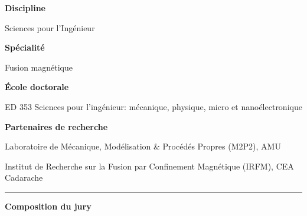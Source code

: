 
\begin{center}
	\begin{minipage}[t]{.37\linewidth}
    	    \vspace{.5em}
        	\textsf{\textbf{Discipline}}
        	
        	\textsf{Sciences pour l'Ingénieur}
        	
    	    \vspace{1em}
        	\textsf{\textbf{Spécialité}}
        	
        	\textsf{Fusion magnétique}
        	
    	    \vspace{2em}
        	\textsf{\textbf{École doctorale}}
        	
        	\textsf{ED 353 Sciences pour l'ingénieur: mécanique, physique, micro et nanoélectronique}
        	
    	    \vspace{1em}
        	\textsf{\textbf{Partenaires de recherche}}
        	
        	\textsf{Laboratoire de Mécanique, Modélisation \& Procédés Propres (M2P2), AMU}
        	
    	    \vspace{0.4em}			        	
        	\textsf{Institut de Recherche sur la Fusion par Confinement Magnétique (IRFM), CEA Cadarache}

	\end{minipage}\hfill
	\begin{minipage}[t]{.02\linewidth}
		\centering
	    \rule[-280pt]{1pt}{280pt}
	\end{minipage}\hfill
	\begin{minipage}[t]{.6\linewidth}
	    \vspace{.5em}
    	\textsf{\textbf{Composition du jury}}


\end{minipage}
\end{center}
